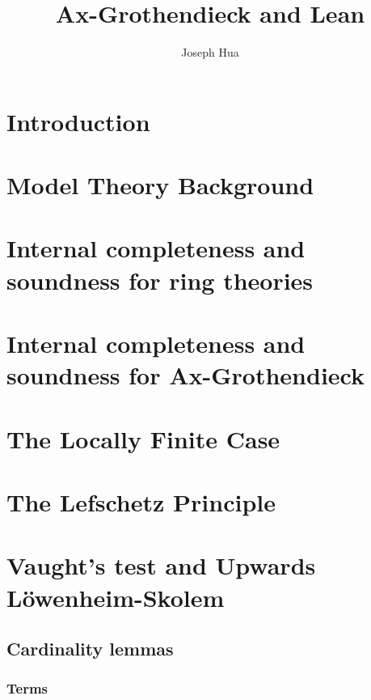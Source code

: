 \documentclass{article}
\newcommand{\<}{\langle}
\renewcommand{\>}{\rangle}
\theoremstyle{definitionstyle}
\theoremstyle{exercisestyle}
\theoremstyle{remarkstyle}
\begin{document}
\title{Ax-Grothendieck and Lean}
\author{Joseph Hua}
\maketitle

\tableofcontents

\newpage
\section{Introduction}


\section{Model Theory Background}


\section{Internal completeness and soundness for ring theories}


\section{Internal completeness and soundness
  for Ax-Grothendieck}


\section{The Locally Finite Case}


\section{The Lefschetz Principle}


\section{Vaught's test and Upwards L\"{o}wenheim-Skolem}


\subsection{Cardinality lemmas}

\subsubsection{Terms}
\end{document}
